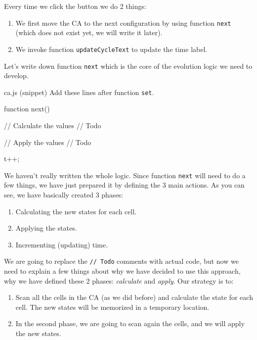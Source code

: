 Every time we click the button we do 2 things:

\begin{enumerate}
\item We first move the CA to the next configuration by using
function \texttt{next} (which does not exist yet, we will write it later).
\item We invoke function \texttt{updateCycleText} to update the time label.
\end{enumerate}

Let's write down function \texttt{next} which is the core of the evolution logic we need to develop.

\begin{programcode}{ca.js (snippet)}
Add these lines after function \texttt{set}.
\begin{code}
function next() {
  // Calculate the values
  // Todo

  // Apply the values
  // Todo

  t++;
}
\end{code}
\end{programcode}

We haven't really written the whole logic. Since function \texttt{next} will need to do a few things, we
have just prepared it by defining the 3 main actions. As you can see, we have basically created 3 phases:

\begin{enumerate}
\item Calculating the new states for each cell.
\item Applying the states.
\item Incrementing (updating) time.
\end{enumerate}

We are going to replace the \texttt{// Todo} comments with actual code, but now we need to explain a few
things about why we have decided to use this approach, why we have defined these 2 phases: 
\textit{calculate} and \textit{apply}. Our strategy is to:

\begin{enumerate}
\item Scan all the cells in the CA (as we did before) and calculate the state for each cell.
The new states will be memorized in a temporary location.
\item In the second phase, we are going to scan again the cells, and we will apply the new states.
\end{enumerate}

